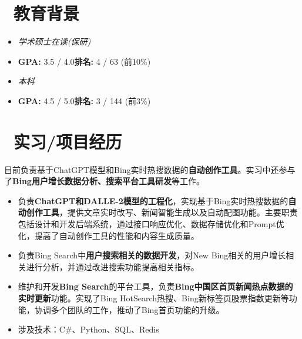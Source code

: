 \documentclass{resume}
\begin{document}


  \section{\faGraduationCap\ 教育背景}
  \begin{itemize}
    \item \textit{学术硕士在读(保研)}
    \item \textbf{GPA:} 3.5 / 4.0\space \space \textbf{排名:} 4 /  63 (前10\%)
  \end{itemize}
  \begin{itemize}
    \item \textit{本科}
    \item \textbf{GPA:} 4.5 / 5.0\space \space \textbf{排名:} 3 / 144 (前3\%)
  \end{itemize}

  \section{\faUsers\ 实习/项目经历}

  目前负责基于ChatGPT模型和Bing实时热搜数据的\textbf{自动创作工具}。实习中还参与了\textbf{Bing用户增长数据分析、搜索平台工具研发}等工作。
  \begin{itemize}
    \item 负责\textbf{ChatGPT和DALLE-2模型的工程化}，实现基于Bing实时热搜数据的\textbf{自动创作工具}，提供文章实时改写、新闻智能生成以及自动配图功能。主要职责包括设计和开发后端系统，通过接口响应优化、数据存储优化和Prompt优化，提高了自动创作工具的性能和内容生成质量。
    \item 负责Bing Search中\textbf{用户搜索相关的数据开发}，对New Bing相关的用户增长相关进行分析，并通过改进搜索功能提高相关指标。
    \item 维护和开发\textbf{Bing Search}的平台工具，负责\textbf{Bing中国区首页新闻热点数据的实时更新}功能。实现了Bing HotSearch热搜、Bing新标签页股票指数更新等功能，协调多个团队的工作，推动了Bing首页功能的升级。
    \item 涉及技术：C\#、Python、SQL、Redis
  \end{itemize}
  
\end{document}
